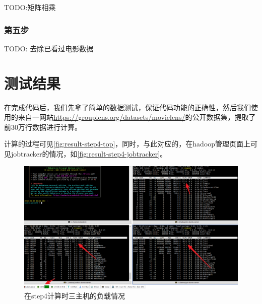 \documentclass[forprint]{myreport}
\begin{document}
TODO:矩阵相乘

\subsection{第五步}

TODO: 去除已看过电影数据


\chapter{测试结果}

在完成代码后，我们先拿了简单的数据测试，保证代码功能的正确性，然后我们使用的来自一网站\url{https://grouplens.org/datasets/movielens/}的公开数据集，提取了前30万行数据进行计算。

计算的过程可见\autoref{fig:result-step4-top}，同时，与此对应的，在hadoop管理页面上可见jobtracker的情况，如\autoref{fig:result-step4-jobtracker}。

\begin{figure}[htp]
  \centering
  \includegraphics[width=13cm]{"./figure/2018-07-03-14-41-38.png"}
  \caption{在step4计算时三主机的负载情况}
  \label{fig:result-step4-top}
\end{figure}
\end{document}
